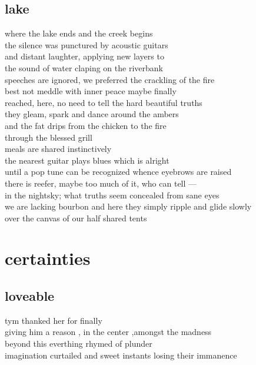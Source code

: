 \documentclass{article}
\begin{document}
\subsection{lake}

where the lake ends and the creek begins\\
the silence was punctured by acoustic guitars\\
and distant laughter, applying new layers to\\
the sound of water claping on the riverbank\\
speeches are ignored, we preferred the crackling of the fire\\

best not meddle with inner peace maybe finally\\
reached, here, no need to tell the hard beautiful truths\\
they gleam, spark and dance around the ambers\\
and the fat drips from the chicken to the fire\\
through the blessed grill\\

meals are shared instinctively\\
the nearest guitar plays blues which is alright\\
until a pop tune can be recognized whence eyebrows are raised\\
there is reefer, maybe too much of it, who can tell --- \\
in the nightsky; what truths seem concealed from sane eyes\\
we are lacking bourbon and
here they simply ripple and glide slowly\\
over the canvas of our half shared tents\\

\clearpage

\section{certainties}
\subsection{loveable}

tym thanked her for finally\\
giving him a reason , in the center ,amongst the madness\\
beyond this everthing rhymed of plunder\\
imagination curtailed and sweet instants losing their immanence\\
\end{document}

